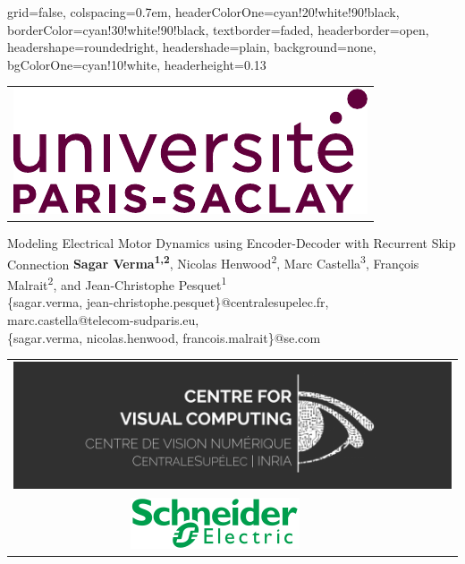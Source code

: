 \documentclass[landscape,a0paper,fontscale=0.292]{baposter}
\begin{document}
\begin{poster}{
 grid=false,
 colspacing=0.7em,
 headerColorOne=cyan!20!white!90!black,
 borderColor=cyan!30!white!90!black,
 textborder=faded,
 headerborder=open,
 headershape=roundedright,
 headershade=plain,
 background=none,
 bgColorOne=cyan!10!white,
 headerheight=0.13\textheight}
 {
   \begin{tabular}{c}
    \includegraphics[scale=0.45]{logo-ups} \\
   \end{tabular}
 }
 {\sc\Huge Modeling Electrical Motor Dynamics using Encoder-Decoder with Recurrent Skip Connection}
  {\textbf{Sagar Verma\textsuperscript{1,2}}, Nicolas Henwood\textsuperscript{2}, Marc Castella\textsuperscript{3}, Fran\c{c}ois Malrait\textsuperscript{2}, and Jean-Christophe Pesquet\textsuperscript{1} \\
  \{sagar.verma, jean-christophe.pesquet\}@centralesupelec.fr, marc.castella@telecom-sudparis.eu, \\
  \{sagar.verma, nicolas.henwood, francois.malrait\}@se.com
  }
  {
   \begin{tabular}{c c}
     \multicolumn{2}{c}{\includegraphics[scale=0.13]{logo_cvn}} \\
     \includegraphics[scale=0.37]{logo_se} &

\end{tabular}}
\end{poster}
\end{document}
